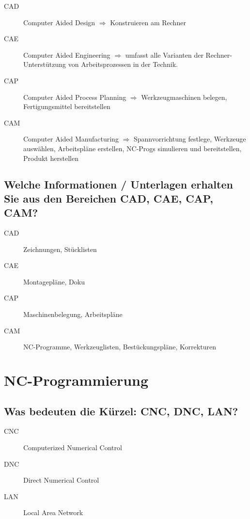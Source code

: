 \begin{description}
    \item[CAD]
        Computer Aided Design $\Rightarrow$ Konstruieren am Rechner
    \item[CAE]
        Computer Aided Engineering $\Rightarrow$ umfasst alle Varianten der
        Rechner-Unterstützung von Arbeitsprozessen in der Technik.
    \item[CAP]
        Computer Aided Process Planning $\Rightarrow$ Werkzeugmaschinen
        belegen, Fertigungsmittel bereitstellen
    \item[CAM]
        Computer Aided Manufacturing $\Rightarrow$ Spannvorrichtung festlege,
        Werkzeuge auswählen, Arbeitspläne erstellen, NC-Progs simulieren und
        bereitstellen, Produkt herstellen
\end{description}

\subsection*{%
    Welche Informationen / Unterlagen erhalten Sie aus den Bereichen CAD, CAE,
    CAP, CAM?
}

\begin{description}
    \item[CAD] Zeichnungen, Stücklisten
    \item[CAE] Montagepläne, Doku
    \item[CAP] Maschinenbelegung, Arbeitspläne
    \item[CAM] NC-Programme, Werkzeuglisten, Bestückungspläne, Korrekturen
\end{description}

\newpage

\section{NC-Programmierung}

\subsection*{Was bedeuten die Kürzel: CNC, DNC, LAN?}

\begin{description}
    \item[CNC] Computerized Numerical Control
    \item[DNC] Direct Numerical Control
    \item[LAN] Local Area Network
\end{description}

